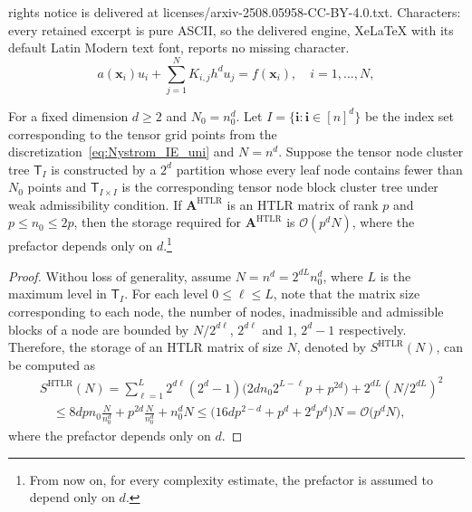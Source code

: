 \documentclass[10pt,a4paper]{amsart}
\newcommand{\HTLR}{\operatorname{HTLR}}
\newcommand{\Matrix}[1]{\boldsymbol{#1}}
\newcommand{\bigO}{\mathscr{O}}
\newcommand{\tree}{\mathsf{T}}
\begin{document}
rights notice is delivered at licenses/arxiv-2508.05958-CC-BY-4.0.txt. Characters: every retained excerpt is pure ASCII, so the delivered engine, XeLaTeX with its default Latin Modern text font, reports no missing character.
\begin{equation} \label{eq:Nystrom_IE_uni}
    a(\Matrix{x}_{i}) u_{i} + \sum_{j = 1}^{N} K_{i, j} h^d u_j = f(\Matrix{x}_{i}), \quad i = 1, \dotsc, N,
\end{equation}

\begin{proposition}
    \label{prop:storage_HTLR_weak}
    For a fixed dimension \(d \geq 2\) and \(N_0  = n_0^d\). Let \(I =
    \{\Matrix{i} \colon \Matrix{i} \in [n]^d\}\) be the index set
    corresponding to the tensor grid points from the
    discretization~\eqref{eq:Nystrom_IE_uni} and \(N = n^d\). Suppose the
    tensor node cluster tree \(\tree_{I}\) is constructed by a \(2^d\)
    partition whose every leaf node contains fewer than \(N_0\) points and
    \(\tree_{I \times I}\) is the corresponding tensor node block cluster
    tree under weak admissibility condition. If \(\Matrix{A}^{\HTLR}\) is
    an HTLR matrix of rank \(p\) and \(p \leq n_0 \leq 2 p\), then the
    storage required for \(\Matrix{A}^{\HTLR}\) is \(\bigO(p^d N)\), where
    the prefactor depends only on \(d\).\footnote{From now on, for every
    complexity estimate, the prefactor is assumed to depend only on
    \(d\).}
\end{proposition}

\begin{proof}
    Withou loss of generality, assume \(N = n^d = 2^{d L} n_0^d\), where
    \(L\) is the maximum level in \(\tree_{I}\). For each level \(0 \leq
    \ell \leq L\), note that the matrix size corresponding to each node,
    the number of nodes, inadmissible and admissible blocks of a node are
    bounded by \(N / 2^{d \ell}\), \(2^{d \ell}\) and \(1\), \(2^d - 1\)
    respectively. Therefore, the storage of an HTLR matrix of size \(N\),
    denoted by \(S^{\HTLR}(N)\), can be computed as
    \begin{equation} \label{eq:storage_HTLR_weak}
        \begin{aligned}
            & S^{\HTLR}(N) = \sum_{\ell = 1}^L 2^{d \ell} (2^d - 1) \bigl(2 d n_0 2^{L - \ell} p + p^{2 d}\bigr) + 2^{d L} (N / 2^{d L})^2 \\
            & \quad \leq 8 d p n_0 \frac{N}{n_0^d} + p^{2 d} \frac{N}{n_0^d} + n_0^d N \leq \biggl(16 d p^{2 - d} + p^d + 2^d p^d\biggr) N = \bigO\bigl(p^d N\bigr),
        \end{aligned}
    \end{equation} 
    where the prefactor depends only on \(d\).
\end{proof}
\end{document}

